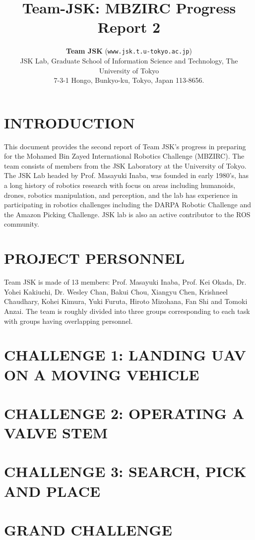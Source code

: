\documentclass[letterpaper, 10 pt, conference]{ieeeconf}  %
\title{\LARGE \bf
  Team-JSK: MBZIRC Progress Report 2
}
\author{\textbf{Team JSK} ({\texttt{www.jsk.t.u-tokyo.ac.jp}})%
  \\ JSK Lab, Graduate School of Information Science and Technology,
  The University of Tokyo \\
  7-3-1 Hongo, Bunkyo-ku, Tokyo, Japan 113-8656.  \\
}
\begin{document}
\maketitle
\thispagestyle{empty}
\pagestyle{empty}


\section{INTRODUCTION}
This document provides the second report of 
Team JSK's progress in preparing
for the Mohamed Bin Zayed International Robotics Challenge
(MBZIRC). The team consists of members from the JSK Laboratory at the
University of Tokyo. The JSK Lab headed by Prof. Masayuki Inaba, was
founded in early 1980’s, has a long
history of robotics research with focus on areas including humanoids,
drones, robotics manipulation, and perception, and the lab has
experience in participating in robotics challenges including the DARPA
Robotic Challenge and the Amazon Picking Challenge. JSK lab is also an
active contributor to the ROS community.


\section{PROJECT PERSONNEL}
Team JSK is made of 13 members: Prof. Masayuki Inaba, Prof. Kei
Okada, Dr. Yohei Kakiuchi, Dr. Wesley Chan, Bakui Chou, Xiangyu Chen,
Krishneel Chaudhary, Kohei Kimura, Yuki Furuta, Hiroto
Mizohana, Fan Shi and Tomoki Anzai. The team is roughly divided into
three groups corresponding to each task with groups having overlapping
personnel.

\section{CHALLENGE 1: LANDING UAV ON A MOVING VEHICLE}




\section{CHALLENGE 2: OPERATING A VALVE STEM}


\section{CHALLENGE 3: SEARCH, PICK AND PLACE}


\section{GRAND CHALLENGE}


\end{document}
